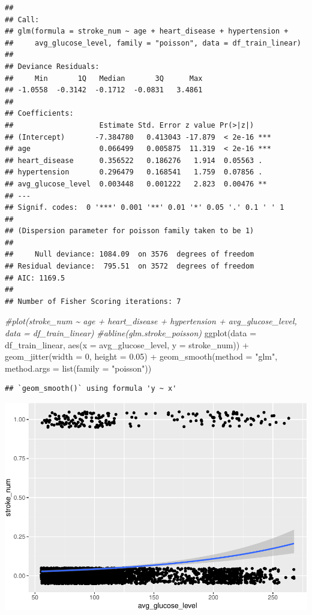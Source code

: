\documentclass[
]{article}
\newenvironment{Shaded}{\begin{snugshade}}{\end{snugshade}}
\newcommand{\AttributeTok}[1]{\textcolor[rgb]{0.77,0.63,0.00}{#1}}
\newcommand{\CommentTok}[1]{\textcolor[rgb]{0.56,0.35,0.01}{\textit{#1}}}
\newcommand{\DecValTok}[1]{\textcolor[rgb]{0.00,0.00,0.81}{#1}}
\newcommand{\FloatTok}[1]{\textcolor[rgb]{0.00,0.00,0.81}{#1}}
\newcommand{\FunctionTok}[1]{\textcolor[rgb]{0.00,0.00,0.00}{#1}}
\newcommand{\NormalTok}[1]{#1}
\newcommand{\SpecialCharTok}[1]{\textcolor[rgb]{0.00,0.00,0.00}{#1}}
\newcommand{\StringTok}[1]{\textcolor[rgb]{0.31,0.60,0.02}{#1}}
\renewcommand{\=}[1]{\stackrel{#1}{=}}
\theoremstyle{definition}
\theoremstyle{remark}
\begin{document}
\begin{verbatim}
## 
## Call:
## glm(formula = stroke_num ~ age + heart_disease + hypertension + 
##     avg_glucose_level, family = "poisson", data = df_train_linear)
## 
## Deviance Residuals: 
##     Min       1Q   Median       3Q      Max  
## -1.0558  -0.3142  -0.1712  -0.0831   3.4861  
## 
## Coefficients:
##                    Estimate Std. Error z value Pr(>|z|)    
## (Intercept)       -7.384780   0.413043 -17.879  < 2e-16 ***
## age                0.066499   0.005875  11.319  < 2e-16 ***
## heart_disease      0.356522   0.186276   1.914  0.05563 .  
## hypertension       0.296479   0.168541   1.759  0.07856 .  
## avg_glucose_level  0.003448   0.001222   2.823  0.00476 ** 
## ---
## Signif. codes:  0 '***' 0.001 '**' 0.01 '*' 0.05 '.' 0.1 ' ' 1
## 
## (Dispersion parameter for poisson family taken to be 1)
## 
##     Null deviance: 1084.09  on 3576  degrees of freedom
## Residual deviance:  795.51  on 3572  degrees of freedom
## AIC: 1169.5
## 
## Number of Fisher Scoring iterations: 7
\end{verbatim}

\begin{Shaded}
\begin{Highlighting}[]
\CommentTok{\#plot(stroke\_num \textasciitilde{} age + heart\_disease + hypertension + avg\_glucose\_level, data = df\_train\_linear)}
\CommentTok{\#abline(glm.stroke\_poisson)}
\FunctionTok{ggplot}\NormalTok{(}\AttributeTok{data =}\NormalTok{ df\_train\_linear, }\FunctionTok{aes}\NormalTok{(}\AttributeTok{x =}\NormalTok{ avg\_glucose\_level, }\AttributeTok{y =}\NormalTok{ stroke\_num)) }\SpecialCharTok{+} 
  \FunctionTok{geom\_jitter}\NormalTok{(}\AttributeTok{width =} \DecValTok{0}\NormalTok{, }\AttributeTok{height =} \FloatTok{0.05}\NormalTok{) }\SpecialCharTok{+}
  \FunctionTok{geom\_smooth}\NormalTok{(}\AttributeTok{method =} \StringTok{"glm"}\NormalTok{, }\AttributeTok{method.args =} \FunctionTok{list}\NormalTok{(}\AttributeTok{family =} \StringTok{"poisson"}\NormalTok{))}
\end{Highlighting}
\end{Shaded}

\begin{verbatim}
## `geom_smooth()` using formula 'y ~ x'
\end{verbatim}

\includegraphics{sioux_mach_learn_project_files/figure-latex/unnamed-chunk-33-1.pdf}
\end{document}
